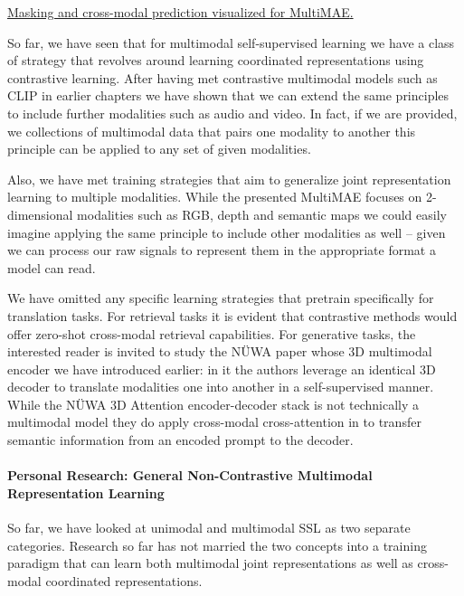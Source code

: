 \documentclass[
]{krantz}
\begin{document}
\href{figures/03-01/multimae.png}{Masking and cross-modal prediction visualized for MultiMAE\citep{bachmann2022multimae}.}

So far, we have seen that for multimodal self-supervised learning we have a class of strategy that revolves around learning coordinated representations using contrastive learning. After having met contrastive multimodal models such as CLIP in earlier chapters we have shown that we can extend the same principles to include further modalities such as audio and video. In fact, if we are provided, we collections of multimodal data that pairs one modality to another this principle can be applied to any set of given modalities.

Also, we have met training strategies that aim to generalize joint representation learning to multiple modalities. While the presented MultiMAE focuses on 2-dimensional modalities such as RGB, depth and semantic maps we could easily imagine applying the same principle to include other modalities as well -- given we can process our raw signals to represent them in the appropriate format a model can read.

We have omitted any specific learning strategies that pretrain specifically for translation tasks. For retrieval tasks it is evident that contrastive methods would offer zero-shot cross-modal retrieval capabilities. For generative tasks, the interested reader is invited to study the NÜWA paper whose 3D multimodal encoder we have introduced earlier: in it the authors leverage an identical 3D decoder to translate modalities one into another in a self-supervised manner. While the NÜWA 3D Attention encoder-decoder stack is not technically a multimodal model they do apply cross-modal cross-attention in to transfer semantic information from an encoded prompt to the decoder.

\hypertarget{personal-research-general-non-contrastive-multimodal-representation-learning}{%
\paragraph{Personal Research: General Non-Contrastive Multimodal Representation Learning}\label{personal-research-general-non-contrastive-multimodal-representation-learning}}

So far, we have looked at unimodal and multimodal SSL as two separate categories. Research so far has not married the two concepts into a training paradigm that can learn both multimodal joint representations as well as cross-modal coordinated representations.
\end{document}
